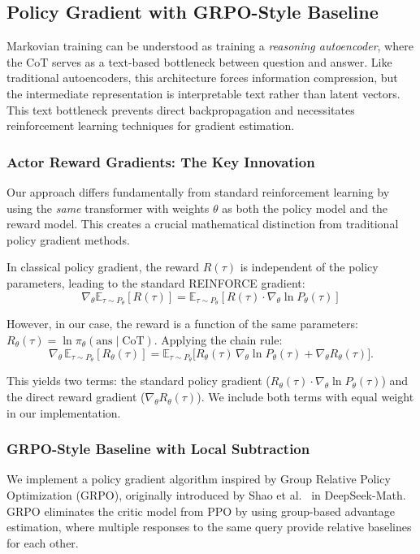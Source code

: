 \documentclass{article} %
\begin{document}
\subsection{Policy Gradient with GRPO-Style Baseline}
\label{subsec:grpo}

Markovian training can be understood as training a \emph{reasoning autoencoder}, where the CoT serves as a text-based bottleneck between question and answer. Like traditional autoencoders, this architecture forces information compression, but the intermediate representation is interpretable text rather than latent vectors. This text bottleneck prevents direct backpropagation and necessitates reinforcement learning techniques for gradient estimation.

\subsubsection{Actor Reward Gradients: The Key Innovation}
Our approach differs fundamentally from standard reinforcement learning by using the \emph{same} transformer with weights $\theta$ as both the policy model and the reward model. This creates a crucial mathematical distinction from traditional policy gradient methods.

In classical policy gradient, the reward $R(\tau)$ is independent of the policy parameters, leading to the standard REINFORCE gradient:
$$\nabla_\theta \mathbb{E}_{\tau \sim P_\theta}[R(\tau)] = \mathbb{E}_{\tau \sim P_\theta}[R(\tau) \cdot \nabla_\theta \ln P_\theta(\tau)]$$

However, in our case, the reward is a function of the same parameters: $R_\theta(\tau) = \ln \pi_\theta(\text{ans} \mid \text{CoT})$. Applying the chain rule:
\[\nabla_\theta \,\mathbb{E}_{\tau \sim P_\theta}[R_\theta(\tau)]
= \mathbb{E}_{\tau \sim P_\theta}\!\big[R_\theta(\tau)\, \nabla_\theta \ln P_\theta(\tau) + \nabla_\theta R_\theta(\tau)\big].\]

This yields two terms: the standard policy gradient ($R_\theta(\tau) \cdot \nabla_\theta \ln P_\theta(\tau)$) and the direct reward gradient ($\nabla_\theta R_\theta(\tau)$). We include both terms with equal weight in our implementation.

\subsubsection{GRPO-Style Baseline with Local Subtraction}
We implement a policy gradient algorithm inspired by Group Relative Policy Optimization (GRPO), originally introduced by Shao et al.~\cite{shao2024deepseekmath} in DeepSeek-Math. GRPO eliminates the critic model from PPO by using group-based advantage estimation, where multiple responses to the same query provide relative baselines for each other.
\end{document}
